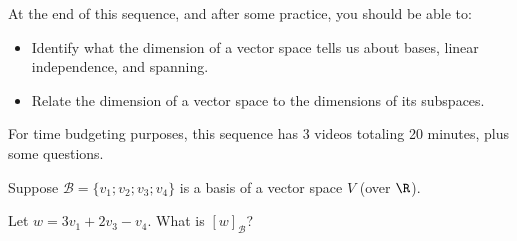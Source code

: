 







At the end of this sequence, and after some practice, you should be able to:

\begin{itemize} 
\item Identify what the dimension of a vector space tells us about bases, linear independence, and spanning.  
\item Relate the dimension of a vector space to the dimensions of its subspaces.   
\end{itemize}


For time budgeting purposes, this sequence has 3 videos totaling 20 minutes, 
plus some questions.  




\endedxtext

\endedxvertical












Suppose $\mathcal{B} = \{v_1; v_2; v_3; v_4\}$ is a basis of a vector space $V$ (over $\R$).  

Let $w = 3v_1 + 2v_3 - v_4.$  What is $[w]_{\mathcal{B}}$?  







\endedxproblem



\endedxvertical





